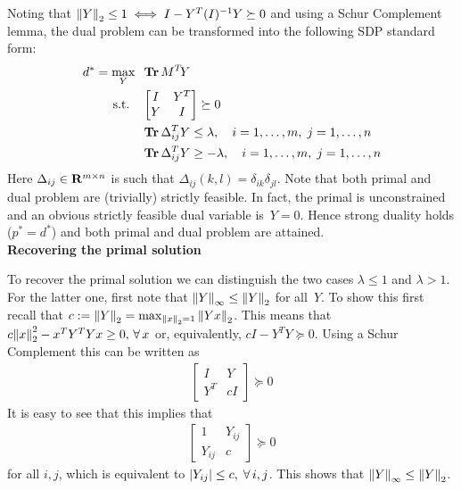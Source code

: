 Noting that ${\left\|Y\right\|}_{2}^{}\leq 1 \; \Longleftrightarrow \; I-Y^T(I)^{-1}Y \succeq 0$ and using a Schur Complement lemma, the dual problem can be transformed into the following SDP standard form:
\begin{align}
\begin{split}
d^* = \max_{Y} \;\; &\operatorname{\mathbf{Tr}} M^T\!Y \\ 
\text{s.t.} \quad &\begin{bmatrix} I & Y^T \\ Y & I \end{bmatrix} \succeq 0 \\
&\operatorname{\mathbf{Tr}} \Delta_{ij}^TY \leq \lambda, \quad i = 1,\dotsc, m, \; j=1,\dotsc,n \\
&\operatorname{\mathbf{Tr}} \Delta_{ij}^TY \geq -\lambda, \quad i = 1,\dotsc, m, \; j=1,\dotsc,n
\end{split}
\label{Algorithms:MainAlgs:IPM:SDPform:DualSDP}
\end{align}
%
Here $\Delta_{ij} \in {\mathbf R}^{m\times n}$ is such that $\Delta_{ij}(k,l) = \delta_{ik}\delta_{jl}$. Note that both primal and dual problem are (trivially) strictly feasible. In fact, the primal is unconstrained and an obvious strictly feasible dual variable is~$Y=0$. Hence strong duality holds ($p^* = d^*$) and both primal and dual problem are attained.\\

\textbf{Recovering the primal solution}

To recover the primal solution we can distinguish the two cases $\lambda \leq 1$ and $\lambda >1$. For the latter one, first note that ${\left\|Y\right\|}_{\infty}^{} \leq {\left\|Y\right\|}_{2}^{}$ for all~$Y$. To show this first recall that $c := {\left\|Y\right\|}_{2}^{} = \max_{{\left\|x\right\|}_{2}^{}=1} {\left\|Yx\right\|}_{2}^{}$. This means that $c {\left\|x\right\|}_{2}^{2} - x^TY^TYx \geq0, \,{\forall \,} x$ or, equivalently, $cI-Y^TY \succeq 0$. Using a Schur Complement this can be written as
%
\begin{align*}
\begin{bmatrix} I & Y \\Y^T & cI \end{bmatrix} \succeq 0
\end{align*}
It is easy to see that this implies that  
\begin{align*}
\begin{bmatrix} 1 & Y_{ij} \\Y_{ij} & c \end{bmatrix} \succeq 0
\end{align*}
for all $i,j$, which is equivalent to $|Y_{ij}| \leq c,\; {\forall \,} i,j$. This shows that ${\left\|Y\right\|}_{\infty}^{} \leq {\left\|Y\right\|}_{2}^{}$.

